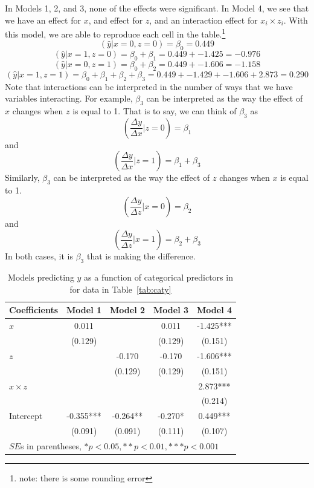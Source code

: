 In Models 1, 2, and 3, none of the effects were significant. In Model 4, we see that we have an effect for $x$, and effect for $z$, and an interaction effect for $x_i\times z_i$. With this model, we are able to reproduce each cell in the table.\footnote{note: there is some rounding error}
\[
\left(\hat{y}|x=0,z=0\right)=\beta_0=0.449
\]
\[
\left(\hat{y}|x=1,z=0\right)=\beta_0+\beta_1=0.449+-1.425=-0.976
\]
\[
\left(\hat{y}|x=0,z=1\right)=\beta_0+\beta_2=0.449+-1.606=-1.158
\]
\[
\left(\hat{y}|x=1,z=1\right)=\beta_0+\beta_1+\beta_2+\beta_3=0.449+-1.429+-1.606+2.873=0.290
\]
Note that interactions can be interpreted in the number of ways that we have variables interacting. For example, $\beta_3$ can be interpreted as the way the effect of $x$ changes when $z$ is equal to 1. That is to say, we can think of $\beta_3$ as
\[
\left(\frac{\Delta y}{\Delta x}\vert z=0\right)=\beta_1
\]
and
\[
\left(\frac{\Delta y}{\Delta x}\vert z=1\right)=\beta_1+\beta_3
\]
Similarly, $\beta_3$ can be interpreted as the way the effect of $z$ changes when $x$ is equal to 1.
\[
\left(\frac{\Delta y}{\Delta z}\vert x=0\right)=\beta_2
\]
and
\[
\left(\frac{\Delta y}{\Delta z}\vert x=1\right)=\beta_2+\beta_3
\]
In both cases, it is $\beta_3$ that is making the difference.
\begin{table}[htbp]\centering
\caption{Models predicting $y$ as a function of categorical predictors in for data in Table~\ref{tab:caty}
\label{tab:catyreg}}
\begin{tabular}{lcccc}
\hline
Coefficients&   Model 1  &   Model 2  &     Model 3  &    Model 4  \\
\hline
$x$     &    0.011  &        &    0.011  &   -1.425***\\
      &   (0.129)  &        &   (0.129)  &   (0.151)  \\
$z$     &        &   -0.170  &   -0.170  &   -1.606***\\
      &        &   (0.129)  &   (0.129)  &   (0.151)  \\
$x\times z$   &        &        &        &    2.873***\\
      &        &        &        &   (0.214)  \\
Intercept    &   -0.355***&   -0.264** &   -0.270* &    0.449***\\
      &   (0.091)  &   (0.091)  &   (0.111)  &   (0.107)  \\
\hline
\multicolumn{5}{l}{$SE$s in parentheses, $* p < 0.05, ** p < 0.01, ***p<0.001$} \\
\hline
\end{tabular}
\end{table}
